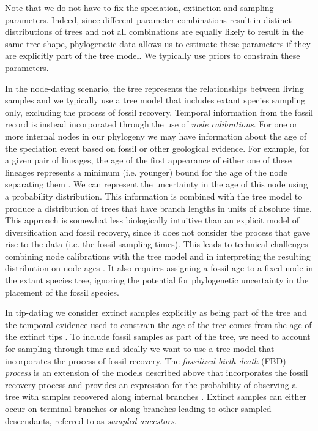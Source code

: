 Note that we do not have to fix the speciation, extinction and sampling parameters. 
Indeed, since different parameter combinations result in distinct distributions of trees and not all combinations are equally likely to result in the same tree shape, phylogenetic data  allows us to estimate these parameters if they are explicitly part of the tree model. 
We typically use priors to constrain these parameters.

In the node-dating scenario, the tree represents the relationships between living samples and we typically use a tree model that includes extant species sampling only, excluding the process of fossil recovery.
Temporal information from the fossil record is instead incorporated through the use of \textit{node calibrations}. 
For one or more internal nodes in our phylogeny we may have information about the age of the speciation event based on fossil or other geological evidence.
For example, for a given pair of lineages, the age of the first appearance of either one of these lineages represents a minimum (i.e. younger) bound for the age of the node separating them \citep{Parham2012}.
We can represent the uncertainty in the age of this node using a probability distribution. %
This information is combined with the tree model to produce a distribution of trees that have branch lengths in units of absolute time.
This approach is somewhat less biologically intuitive than an explicit model of diversification and fossil recovery, since it does not consider the process that gave rise to the data (i.e. the fossil sampling times).
This leads to technical challenges combining node calibrations with the tree model and in interpreting the resulting distribution on node ages \citep{Heled2012,Warnock2015}.
It also requires assigning a fossil age to a fixed node in the extant species tree, ignoring the potential for phylogenetic uncertainty in the placement of the fossil species.

In tip-dating we consider extinct samples explicitly as being part of the tree and the temporal evidence used to constrain the age of the tree comes from the age of the extinct tips \citep{Ronquist2012a}.
To include fossil samples as part of the tree, we need to account for sampling through time and ideally we want to use a tree model that incorporates the process of fossil recovery.
The \textit{fossilized birth-death} (FBD) \textit{process} is an extension of the models described above that incorporates the fossil recovery process and provides an expression for the probability of observing a tree with samples recovered along internal branches \citep{Stadler2010,Heath2014,Gavryushkina2014}.
Extinct samples can either occur on terminal branches or along branches leading to other sampled descendants, referred to as \textit{sampled ancestors}.

